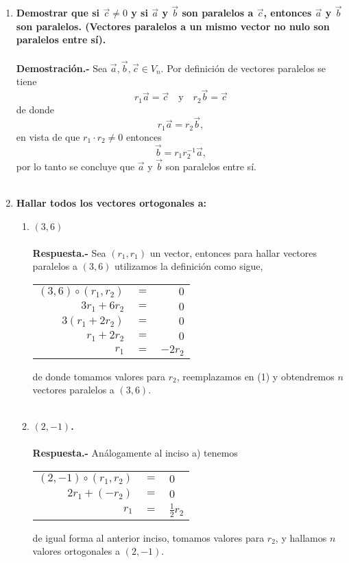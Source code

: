 \begin{enumerate}
\begin{enumerate}[\bfseries a)]
\end{enumerate}

\item \textbf{\boldmath Demostrar que si $\vec{c}\neq 0$ y si $\vec{a}$ y $\vec{b}$ son paralelos a $\vec{c}$, entonces $\vec{a}$ y $\vec{b}$ son paralelos. (Vectores paralelos a un mismo vector no nulo son paralelos entre sí).\\\\
    Demostración.-}\; Sea $\vec{a},\vec{b},\vec{c}\in V_n$. Por definición de vectores paralelos se tiene $$r_1\vec{a}=\vec{c}\quad \mbox{y} \quad r_2\vec{b}=\vec{c}$$ de donde $$r_1\vec{a}=r_2\vec{b},$$ en vista de que $r_1\cdot r_2 \neq 0$ entonces $$\vec{b}=r_1r_2^{-1} \vec{a},$$ por lo tanto se concluye que $\vec{a}$ y $\vec{b}$ son paralelos entre sí.\\\\

\item \textbf{\boldmath Hallar todos los vectores ortogonales a:}
\begin{enumerate}[\bfseries a)]
    
    \item \textbf{\boldmath $(3,6)$\\\\
	Respuesta.-}\; Sea $(r_1,r_1)$ un vector, entonces para hallar vectores paralelos a $(3,6)$ utilizamos la definición como sigue,
	\begin{center}	
	    \begin{tabular}{rcr}
		$(3,6)\circ (r_1,r_2)$&$=$&$0$\\
		$3r_1+6r_2$&$=$&$0$\\
		$3(r_1+2r_2)$&$=$&$0$\\
		$r_1+2r_2$&$=$&$0$\\
		$r_1$&$=$&$-2r_2$\\
	    \end{tabular}
	\end{center}
	de donde tomamos valores para $r_2$, reemplazamos en (1) y obtendremos $n$ vectores paralelos a $(3,6)$.\\\\

    \item  \textbf{\boldmath $(2,-1)$.\\\\
	Respuesta.-}\; Análogamente al inciso a) tenemos 
	\begin{center}
	\begin{tabular}{rcl}
	    $(2,-1)\circ (r_1,r_2)$&$=$&$0$\\
	    $2r_1 + (-r_2)$&$=$&$0$\\
	    $r_1$&$=$&$\frac{1}{2}r_2$\\
	\end{tabular}
	\end{center}
	de igual forma al anterior inciso, tomamos valores para $r_2$, y hallamos $n$ valores ortogonales a $(2,-1)$.\\\\


\end{enumerate}
\end{enumerate}
